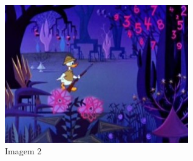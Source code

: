 \documentclass[a4paper, 12pt]{article}
\begin{document}
  \begin{figure}[ht!]
    \centering
    \includegraphics[width=80mm]{img2.png}
    \caption{Imagem 2}
  \end{figure}
\end{document}
